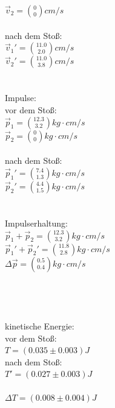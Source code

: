 \documentclass[12pt,a4paper]{article}
\begin{document}
\begin{multicols}{2}
$\vec v_2 =\binom{0}{0} cm/s$\\
\\
nach dem Stoß:\\
$\vec v_1' =\binom{11.0}{2.0} cm/s$\\
$\vec v_2 '=\binom{11.0}{3.8} cm/s$\\
\\
\\
Impulse:\\
vor dem Stoß:\\
$\vec p_1 =\binom{12.3}{3.2} kg\cdot cm/s$\\
$\vec p_2 =\binom{0}{0} kg\cdot cm/s$\\
\\
nach dem Stoß:\\
$\vec p_1' =\binom{7.4}{1.3} kg\cdot cm/s$\\
$\vec p_2 '=\binom{4.4}{1.5} kg\cdot cm/s$\\
\\
\\
Impulserhaltung:\\
$\vec p_1 + \vec p_2 = \binom{12.3}{3.2} kg\cdot cm/s$\\
$\vec p_1' + \vec p_2' = \binom{11.8}{2.8} kg\cdot cm/s$\\
$\Delta \vec p =  \binom{0.5}{0.4} kg\cdot cm/s$\\
\\
\\
\\
\\
kinetische Energie:\\
vor dem Stoß:\\
$T = (0.035 \pm 0.003) J$\\
nach dem Stoß:\\
$T'=(0.027 \pm 0.003) J$\\
\\
$\Delta T= (0.008 \pm 0.004) J$
\\
\\



\end{multicols}
\end{document}
